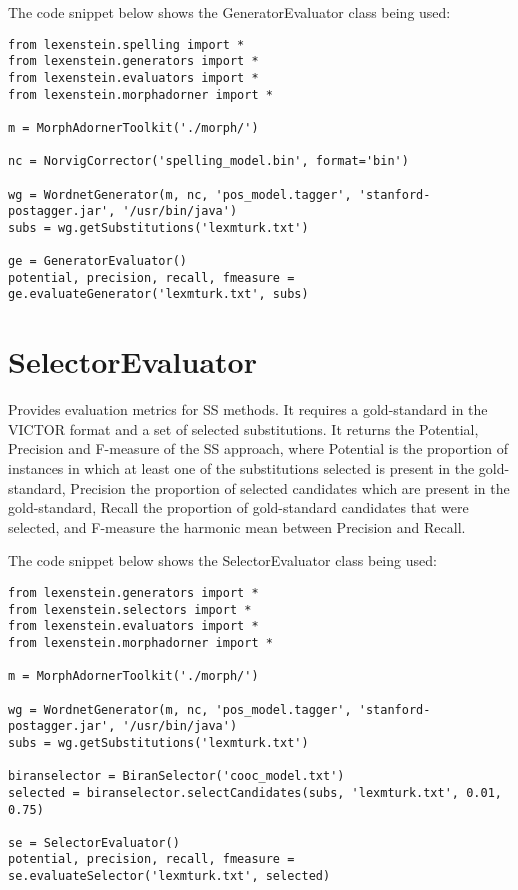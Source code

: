 The code snippet below shows the GeneratorEvaluator class being used:

\begin{lstlisting}
from lexenstein.spelling import *
from lexenstein.generators import *
from lexenstein.evaluators import *
from lexenstein.morphadorner import *

m = MorphAdornerToolkit('./morph/')

nc = NorvigCorrector('spelling_model.bin', format='bin')

wg = WordnetGenerator(m, nc, 'pos_model.tagger', 'stanford-postagger.jar', '/usr/bin/java')
subs = wg.getSubstitutions('lexmturk.txt')

ge = GeneratorEvaluator()
potential, precision, recall, fmeasure = ge.evaluateGenerator('lexmturk.txt', subs)
\end{lstlisting}













\section{SelectorEvaluator}

Provides evaluation metrics for SS methods. It requires a gold-standard in the VICTOR format and a set of selected substitutions. It returns the Potential, Precision and F-measure of the SS approach, where Potential is the proportion of instances in which at least one of the substitutions selected is present in the gold-standard, Precision the proportion of selected candidates which are present in the gold-standard, Recall the proportion of gold-standard candidates that were selected, and F-measure the harmonic mean between Precision and Recall.

The code snippet below shows the SelectorEvaluator class being used:

\begin{lstlisting}
from lexenstein.generators import *
from lexenstein.selectors import *
from lexenstein.evaluators import *
from lexenstein.morphadorner import *

m = MorphAdornerToolkit('./morph/')

wg = WordnetGenerator(m, nc, 'pos_model.tagger', 'stanford-postagger.jar', '/usr/bin/java')
subs = wg.getSubstitutions('lexmturk.txt')

biranselector = BiranSelector('cooc_model.txt')
selected = biranselector.selectCandidates(subs, 'lexmturk.txt', 0.01, 0.75)

se = SelectorEvaluator()
potential, precision, recall, fmeasure = se.evaluateSelector('lexmturk.txt', selected)
\end{lstlisting}









